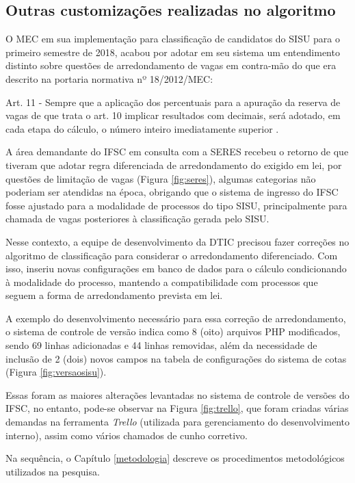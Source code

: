 \subsection{Outras customizações realizadas no algoritmo}
\label{outrasVersoes}

O \gls{MEC} em sua implementação para classificação de candidatos do \gls{SISU} para o primeiro semestre de 2018, acabou por adotar em seu sistema um entendimento distinto sobre questões de arredondamento de vagas em contra-mão do que era descrito na portaria normativa nº 18/2012/MEC:

\begin{citacao}
Art. 11 - Sempre que a aplicação dos percentuais para a apuração da reserva de vagas de que trata o art. 10 implicar resultados com decimais, será adotado, em cada etapa do cálculo, o número inteiro imediatamente superior \cite{portarianr9}.
\end{citacao}



\newpage
A área demandante do \gls{IFSC} em consulta com a \gls{SERES} recebeu o retorno de que tiveram que adotar regra diferenciada de arredondamento do exigido em lei, por questões de limitação de vagas (Figura \ref{fig:seres}), algumas categorias não poderiam ser atendidas na época, obrigando que o sistema de ingresso do \gls{IFSC} fosse ajustado para a modalidade de processos do tipo \gls{SISU}, principalmente para chamada de vagas posteriores à classificação gerada pelo \gls{SISU}.

Nesse contexto, a equipe de desenvolvimento da \gls{DTIC} precisou fazer correções no algoritmo de classificação para considerar o arredondamento diferenciado. Com isso, inseriu novas configurações em banco de dados para o cálculo condicionando à modalidade do processo, mantendo a compatibilidade com processos que seguem a forma de arredondamento prevista em lei.

A exemplo do desenvolvimento necessário para essa correção de arredondamento, o sistema de controle de versão indica como 8 (oito) arquivos PHP modificados, sendo 69 linhas adicionadas e 44 linhas removidas, além da necessidade de inclusão de 2 (dois) novos campos na tabela de configurações do sistema de cotas (Figura \ref{fig:versaosisu}).



\newpage
Essas foram as maiores alterações levantadas no sistema de controle de versões do \gls{IFSC}, no entanto, pode-se observar na Figura \ref{fig:trello}, que foram criadas várias demandas na ferramenta \textit{Trello} (utilizada para gerenciamento do desenvolvimento interno), assim como vários chamados de cunho corretivo.  

%



\newpage
Na sequência, o Capítulo \ref{metodologia} descreve os procedimentos metodológicos utilizados na pesquisa.







